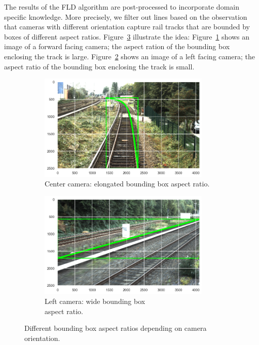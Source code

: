 \documentclass[Master,MDS,english]{BASE/twbook} %
\begin{document}
The results of the FLD algorithm are post-processed to incorporate domain specific knowledge. More precisely, we filter out lines based on the observation that cameras with different orientation capture rail tracks that are bounded by boxes of different aspect ratios. Figure~\ref{fig:bb_examples} illustrate the idea: Figure~\ref{fig:bb_long} shows an image of a forward facing camera; the aspect ration of the bounding box enclosing the track is large.  Figure~\ref{fig:bb_wide} shows an image of a left facing camera; the aspect ratio of the bounding box enclosing the track is small.


\begin{figure}
\centering
\begin{subfigure}[t]{.5\textwidth}
  \centering
  \includegraphics[width=0.9\textwidth]{images/datasets/db/aspect_ratio_long}
  \caption{Center camera: elongated bounding box aspect ratio.}
   \label{fig:bb_long}
\end{subfigure}%
\begin{subfigure}[t]{.5\textwidth}
  \centering
  \includegraphics[width=0.9\textwidth]{images/datasets/db/aspect_ratio_wide}
  \caption{Left camera: wide bounding box \\ aspect ratio. }
  \label{fig:bb_wide}
\end{subfigure}
\caption{Different bounding box aspect ratios depending on camera orientation.}
\label{fig:bb_examples}
\end{figure}
\end{document}
